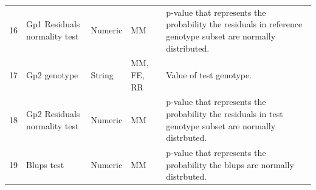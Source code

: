 \documentclass[12pt,a4paper]{article}
\begin{document}
\begin{table}
\begin{tabular}{| l | l | l | l | p{10cm} |}
16&Gp1 Residuals normality test&Numeric&MM&p-value that represents the probability the residuals in reference genotype subset are normally distributed.\\
17&Gp2 genotype&String&MM, FE, RR&Value of test genotype.\\
18&Gp2 Residuals normality test&Numeric&MM&p-value that represents the probability the residuals in test genotype subset are normally distrbuted.\\
19&Blups test&Numeric&MM&p-value that represents the probability the blups are normally distrbuted.\\
\hline  
\end{tabular}
\end{table}

\begin{table}
 

\end{table}
\end{document}
